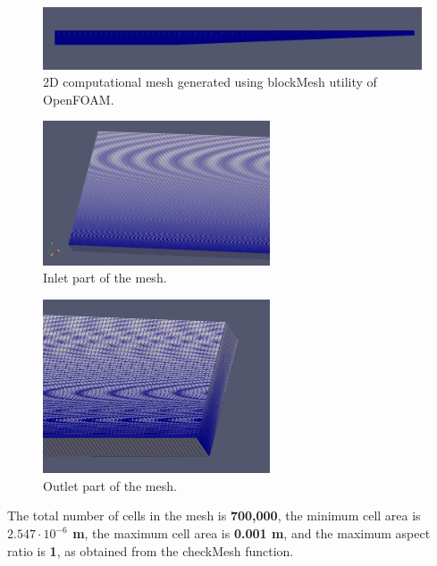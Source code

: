 \documentclass[a4paper]{article}
\begin{document}
\begin{figure}[H]
    \centering
    \includegraphics[width=1\textwidth]{mesh1.png}
    \caption{\small 2D computational mesh generated using blockMesh utility of OpenFOAM.}
    \label{fig:mesh1}
\end{figure} 
\vspace{0.3cm}
\begin{figure}[H]
    \centering
    \includegraphics[width=0.6\textwidth]{mesh2.png}
    \caption{\small Inlet part of the mesh.}
    \label{fig:mesh2}
\end{figure} 
\vspace{0.3cm}
\begin{figure}[H]
    \centering
    \includegraphics[width=0.6\textwidth]{mesh3.png}
    \caption{\small Outlet part of the mesh.}
    \label{fig:mesh3}
\end{figure} 
\vspace{0.3cm}

The total number of cells in the mesh is \textbf{700,000}, the minimum cell area is \textbf{$2.547 \cdot 10^{-6}$ m}, the maximum cell area is \textbf{0.001 m}, and the maximum aspect ratio is \textbf{1}, as obtained from the checkMesh function.
\end{document}
